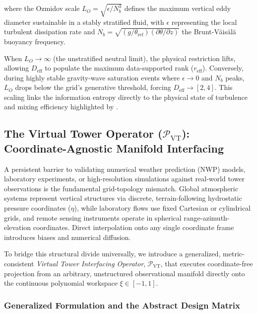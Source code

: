 where the Ozmidov scale $L_O = \sqrt{\epsilon / N_b^3}$ defines the maximum vertical eddy diameter sustainable in a stably stratified fluid, with $\epsilon$ representing the local turbulent dissipation rate and $N_b = \sqrt{(g/\theta_{\mathrm{ref}}) (\partial \theta / \partial z)}$ the Brunt-Väisälä buoyancy frequency.

When $L_O \rightarrow \infty$ (the unstratified neutral limit), the physical restriction lifts, allowing $D_{\mathrm{eff}}$ to populate the maximum data-supported rank ($r_{\mathrm{eff}}$). Conversely, during highly stable gravity-wave saturation events where $\epsilon \rightarrow 0$ and $N_b$ peaks, $L_O$ drops below the grid's generative threshold, forcing $D_{\mathrm{eff}} \rightarrow [2, 4]$. This scaling links the information entropy directly to the physical state of turbulence and mixing efficiency highlighted by \citet{Garanaik2019}.

\subsection{The Virtual Tower Operator ($\mathcal{P}_{\mathrm{VT}}$): Coordinate-Agnostic Manifold Interfacing}
\label{sec:extensions:virtual_tower}

A persistent barrier to validating numerical weather prediction (NWP) models, laboratory experiments, or high-resolution simulations against real-world tower observations is the fundamental grid-topology mismatch. Global atmospheric systems represent vertical structures via discrete, terrain-following hydrostatic pressure coordinates ($\eta$), while laboratory flows use fixed Cartesian or cylindrical grids, and remote sensing instruments operate in spherical range-azimuth-elevation coordinates. Direct interpolation onto any single coordinate frame introduces biases and numerical diffusion.

To bridge this structural divide universally, we introduce a generalized, metric-consistent \emph{Virtual Tower Interfacing Operator}, $\mathcal{P}_{\mathrm{VT}}$, that executes coordinate-free projection from an arbitrary, unstructured observational manifold directly onto the continuous polynomial workspace $\xi \in [-1, 1]$.

\subsubsection{Generalized Formulation and the Abstract Design Matrix}
\label{sec:extensions:p_vt_math}

